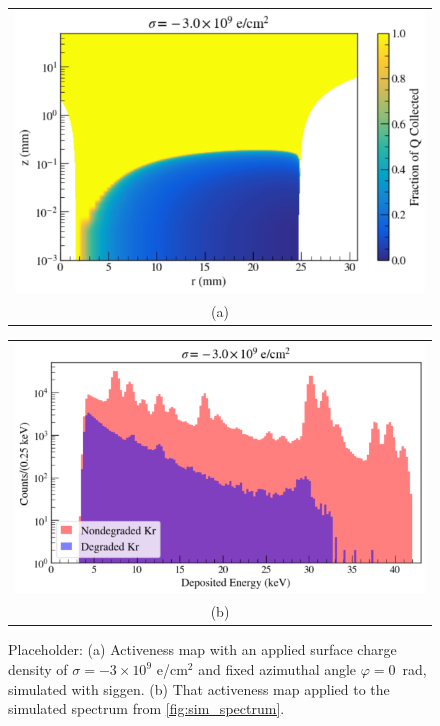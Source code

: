 \documentclass[nofootinbib,superscriptaddress, aps, prc, 
10pt, amsmath, amssymb, bibnotes,
altaffilletter, twocolumn, floatfix]{revtex4-2}
\begin{document}

    \begin{figure}
        \begin{tabular}{@{}c@{}}
            \includegraphics[width=\columnwidth]{figures/minus3e9_activeness_map_theta0.png} \\[\abovecaptionskip]
            \small (a)
        \end{tabular}
        
        \vspace{\floatsep}
        
        \begin{tabular}{@{}c@{}}
            \includegraphics[width=\columnwidth]{figures/minus3e9_simulated_Kr_spectrum.png} \\[\abovecaptionskip]
            \small (b)
        \end{tabular}
        
        \caption{Placeholder: (a) Activeness map with an applied surface charge density of $\sigma = -3 \times 10^{9}$ e/cm$^2$ and fixed azimuthal angle $\varphi = 0$~rad, simulated with siggen. (b) That activeness map applied to the simulated spectrum from \ref{fig:sim_spectrum}.}
        \label{fig:minus3e9_sim_spectrum}
    \end{figure}
\end{document}

